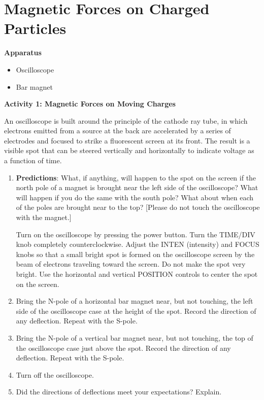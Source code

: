 \section{Magnetic Forces on Charged Particles}

\makelabheader %

\bigskip
\textbf{Apparatus} 
\begin{itemize}[nosep]
\item Oscilloscope
\item Bar magnet
\end{itemize}

\bigskip
\textbf{Activity 1: Magnetic Forces on Moving Charges }

An oscilloscope is built around the principle of the cathode ray tube, in which electrons emitted from a source at the back are accelerated by a series of electrodes and focused to strike a fluorescent screen at its front. The result is a visible spot that can be steered vertically and horizontally to indicate voltage as a function of time.

\begin{enumerate}[labparts]
\item \textbf{Predictions}: What, if anything, will happen to the spot on
the screen if the north pole of a magnet is brought near the left
side of the oscilloscope? What will happen if you do the same with
the south pole? What about when each of the poles are brought near
to the top? {[}Please do not touch the oscilloscope with the magnet.{]} 
\answerspace{30mm}

Turn on the oscilloscope by pressing the power button. Turn the TIME/DIV 
knob completely counterclockwise. Adjust the INTEN (intensity) and FOCUS knobs 
so that a small bright spot is formed on the oscilloscope screen by the beam of 
electrons traveling toward the screen. Do not make the spot very bright. 
Use the horizontal and vertical POSITION controls to center the spot 
on the screen.

\item Bring the N-pole of a horizontal bar magnet near, but not touching,
the left side of the oscilloscope case at the height of the spot.
Record the direction of any deflection. Repeat with the S-pole.
\answerspace{20mm}

\item Bring the N-pole of a vertical bar magnet near, but not touching,
the top of the oscilloscope case just above the spot. Record the direction
of any deflection. Repeat with the S-pole.
\answerspace{25mm}

\item Turn off the oscilloscope.
\item Did the directions of deflections meet your expectations? Explain. 
\answerspace{25mm}

\end{enumerate}

